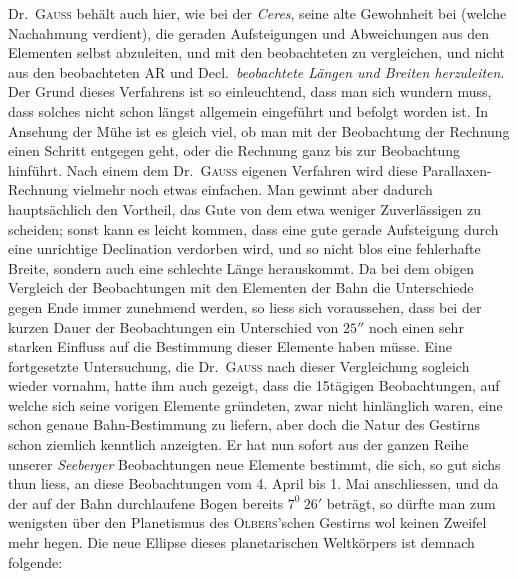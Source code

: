 Dr.\ \textsc{Gauss} behält auch hier, wie bei der \textit{Ceres}, seine alte Gewohnheit bei (welche Nachahmung verdient), die geraden Aufsteigungen und Abweichungen aus den Elementen selbst abzuleiten, und mit den beobachteten zu vergleichen, und nicht aus den beobachteten AR und Decl.\ \textit{beobachtete Längen und Breiten herzuleiten}. Der Grund dieses Verfahrens ist so einleuchtend, dass man sich wundern muss, dass
%
solches nicht schon längst allgemein eingeführt und befolgt worden ist. In Ansehung der Mühe ist es gleich viel, ob man mit der Beobachtung der Rechnung einen Schritt entgegen geht, oder die Rechnung ganz bis zur Beobachtung hinführt. Nach einem dem Dr.\ \textsc{Gauss} eigenen Verfahren wird diese Parallaxen-Rechnung vielmehr noch etwas einfachen. Man gewinnt aber dadurch hauptsächlich den Vortheil, das Gute von dem etwa weniger Zuverlässigen zu scheiden; sonst kann es leicht kommen, dass eine gute gerade Aufsteigung durch eine unrichtige Declination verdorben wird, und so nicht blos eine fehlerhafte Breite, sondern auch eine schlechte Länge herauskommt. Da bei dem obigen Vergleich der Beobachtungen mit den Elementen der Bahn die Unterschiede gegen Ende immer zunehmend werden, so liess sich voraussehen, dass bei der kurzen Dauer der Beobachtungen ein Unterschied von $25''$ noch einen sehr starken Einfluss auf die Bestimmung dieser Elemente haben müsse. Eine fortgesetzte Untersuchung, die Dr.\ \textsc{Gauss} nach dieser Vergleichung sogleich wieder vornahm, hatte ihm auch gezeigt, dass die 15tägigen Beobachtungen, auf welche sich seine vorigen Elemente gründeten, zwar nicht hinlänglich waren, eine schon genaue Bahn-Bestimmung zu liefern, aber doch die Natur des Gestirns schon ziemlich kenntlich anzeigten. Er hat nun sofort aus der ganzen Reihe unserer \textit{Seeberger} Beobachtungen neue Elemente bestimmt, die sich, so gut sichs thun liess, an diese Beobachtungen vom 4. April bis 1. Mai anschliessen, und da der auf der Bahn durchlaufene Bogen bereits $7^0\ 26'$ beträgt, so dürfte man zum wenigsten über den Planetismus des \textsc{Olbers}'schen Gestirns wol keinen Zweifel mehr hegen. Die neue Ellipse dieses planetarischen Weltkörpers ist demnach folgende:
